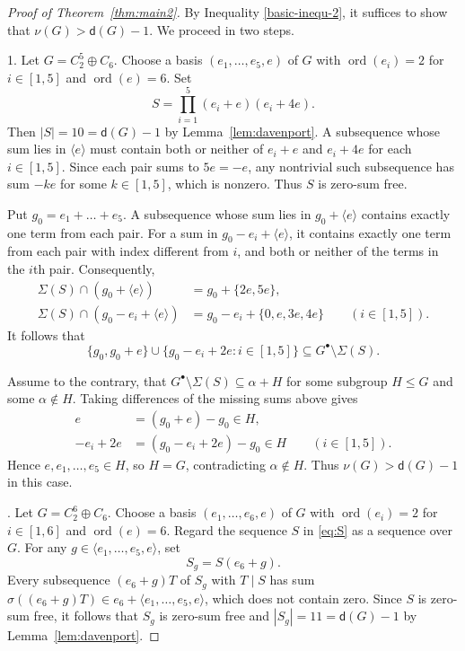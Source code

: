\documentclass[11pt,a4paper]{amsart}
\theoremstyle{plain}
\theoremstyle{definition}
\newcommand{\dd}{\mathsf d}
\DeclareMathOperator{\ord}{ord}
\begin{document}
\medskip
\begin{proof}[Proof of Theorem~\ref{thm:main2}]
By Inequality \eqref{basic-inequ-2},   it suffices to show that $\nu(G)>\dd(G)-1$. We proceed in two steps.

1. Let $G=C_2^5\oplus C_6$.
Choose a basis $(e_1,\ldots,e_5,e)$ of $G$ with
$\ord(e_i)=2$ for $i\in[1,5]$ and $\ord(e)=6$. Set
\begin{equation}\label{eq:S}
 S=\prod_{i=1}^5(e_i+e)(e_i+4e).
\end{equation}
Then $|S|=10=\dd(G)-1$ by Lemma~\ref{lem:davenport}. A subsequence whose sum lies in $\langle e\rangle$
must contain both or neither of $e_i+e$ and $e_i+4e$
for each $i\in[1,5]$. Since each pair sums to $5e=-e$,
any nontrivial such subsequence has sum $-ke$ for some
$k\in[1,5]$, which is nonzero. Thus $S$ is zero-sum free.

Put $g_0=e_1+\ldots+e_5$. A subsequence whose sum lies in
$g_0+\langle e\rangle$ contains exactly one term from each pair.
For a sum in $g_0-e_i+\langle e\rangle$, it contains exactly
one term from each pair with index different from $i$,
and both or neither of the terms in the $i$th pair.
Consequently,
\begin{align*}
 \Sigma(S)\cap(g_0+\langle e\rangle)
   &=g_0+\{2e,5e\},\\
 \Sigma(S)\cap(g_0-e_i+\langle e\rangle)
   &=g_0-e_i+\{0,e,3e,4e\}
   \qquad(i\in[1,5]).
\end{align*}
It follows that
$$
 \{g_0,g_0+e\}
 \cup\{g_0-e_i+2e:i\in[1,5]\}
 \subseteq G^\bullet\setminus\Sigma(S).
$$

Assume to the contrary, that
$G^\bullet\setminus\Sigma(S)\subseteq\alpha+H$
for some subgroup $H\le G$ and some $\alpha\notin H$.
Taking differences of the missing sums above gives
\begin{align*}
 e &= (g_0+e)-g_0\in H,\\
 -e_i+2e &= (g_0-e_i+2e)-g_0\in H
 \qquad(i\in[1,5]).
\end{align*}
Hence $e,e_1,\ldots,e_5\in H$, so $H=G$,
contradicting $\alpha\notin H$. Thus $\nu(G)>\dd(G)-1$ in this case.

. Let $G=C_2^6\oplus C_6$.
Choose a basis $(e_1,\ldots,e_6,e)$ of $G$ with
$\ord(e_i)=2$ for $i\in[1,6]$ and $\ord(e)=6$.
Regard the sequence $S$ in \eqref{eq:S} as a sequence over $G$.
For any $g\in\langle e_1,\ldots,e_5,e\rangle$, set
\begin{equation}\label{eq:lift}
	S_g=S(e_6+g).
\end{equation}
Every subsequence $(e_6+g)T$ of $S_g$ with $T\mid S$ has sum
$\sigma((e_6+g)T)\in e_6+\langle e_1,\ldots,e_5,e\rangle$, which does not contain zero.
Since $S$ is zero-sum free, it follows that $S_g$ is zero-sum free
and $|S_g|=11=\dd(G)-1$ by Lemma~\ref{lem:davenport}.


\end{proof}
\end{document}
